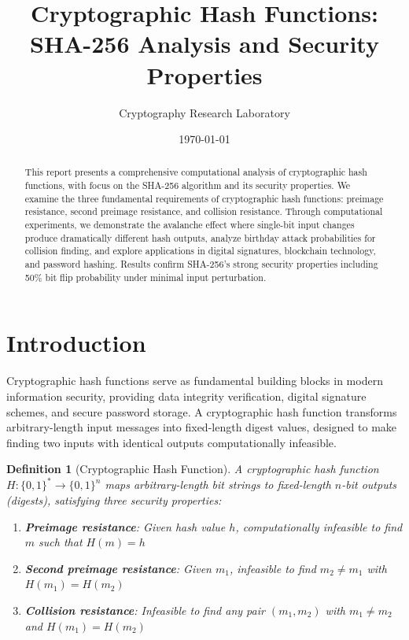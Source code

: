 \documentclass[a4paper, 11pt]{article}
\title{Cryptographic Hash Functions: SHA-256 Analysis and Security Properties}
\author{Cryptography Research Laboratory}
\date{\today}
\newtheorem{definition}{Definition}[section]
\begin{document}
\maketitle

\begin{abstract}
This report presents a comprehensive computational analysis of cryptographic hash functions,
with focus on the SHA-256 algorithm and its security properties. We examine the three
fundamental requirements of cryptographic hash functions: preimage resistance, second preimage
resistance, and collision resistance. Through computational experiments, we demonstrate the
avalanche effect where single-bit input changes produce dramatically different hash outputs,
analyze birthday attack probabilities for collision finding, and explore applications in
digital signatures, blockchain technology, and password hashing. Results confirm SHA-256's
strong security properties including 50\% bit flip probability under minimal input perturbation.
\end{abstract}

\section{Introduction}

Cryptographic hash functions serve as fundamental building blocks in modern information security,
providing data integrity verification, digital signature schemes, and secure password storage.
A cryptographic hash function transforms arbitrary-length input messages into fixed-length
digest values, designed to make finding two inputs with identical outputs computationally infeasible.

\begin{definition}[Cryptographic Hash Function]
A cryptographic hash function $H: \{0,1\}^* \rightarrow \{0,1\}^n$ maps arbitrary-length
bit strings to fixed-length $n$-bit outputs (digests), satisfying three security properties:
\begin{enumerate}
\item \textbf{Preimage resistance}: Given hash value $h$, computationally infeasible to find $m$ such that $H(m) = h$
\item \textbf{Second preimage resistance}: Given $m_1$, infeasible to find $m_2 \neq m_1$ with $H(m_1) = H(m_2)$
\item \textbf{Collision resistance}: Infeasible to find any pair $(m_1, m_2)$ with $m_1 \neq m_2$ and $H(m_1) = H(m_2)$
\end{enumerate}
\end{definition}
\end{document}

